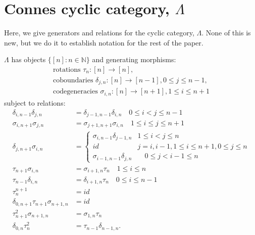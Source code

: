 \chapter{Connes cyclic category, $\Lambda$}\label{chap:lambda}
Here, we give generators and relations for 
the cyclic category, $\Lambda$. None of this 
is new, but we do it to establish notation 
for the rest of the paper.

$\Lambda$ has objects $\{[n]: n \in \mathbb{N}\}$ 
and generating morphisms:
\begin{equation} \label{eqn:cyclic_generators}
\begin{split}
\textrm{rotations } \tau_n:[n] \to [n], \\ 
\textrm{coboundaries } \delta_{j,n}: [n] \to [n-1], 0 \leq j \leq n-1, \\ 
\textrm{codegeneracies } \sigma_{i,n}:[n] \to [n+1], 1 \leq i \leq n+1
\end{split}
\end{equation}
subject to relations:
\begin{equation}\label{eqn:cyclic_relations}
\begin{split}
\delta_{i,n-1} \delta_{j,n} &= \delta_{j-1,n-1} \delta_{i,n} 
  \quad 0 \leq i < j \leq n-1 \\
\sigma_{i,n+1} \sigma_{j,n} &= \sigma_{j+1,n+1} \sigma_{i,n}
  \quad 1 \leq i \leq j \leq n+1 \\
\delta_{j,n+1}\sigma_{i,n} &= 
  \begin{cases}
    \sigma_{i,n-1}\delta_{j-1,n} 
      & 1 \leq i < j \leq n\\
    id & j = i, i-1, 
      1 \leq i \leq n+1, 0 \leq j \leq n\\
    \sigma_{i-1,n-1}\delta_{j,n} 
      & \quad 0 \leq j < i-1 \leq n
   \end{cases}\\
\tau_{n+1}\sigma_{i,n} &= \sigma_{i+1,n}\tau_n
  \quad 1 \leq i \leq n\\   
\tau_{n-1}\delta_{i,n} &= \delta_{i+1,n}\tau_n
  \quad 0 \leq i \leq n-1\\  
\tau_{n}^{n+1} &= id \\
\delta_{0,n+1}\tau_{n+1}\sigma_{n+1,n} &= id\\
\tau_{n+1}^2 \sigma_{n+1,n} &= \sigma_{1,n} \tau_n \\
\delta_{0,n}\tau_n^2 &= \tau_{n-1}\delta_{n-1,n}. 
\end{split}
\end{equation}

